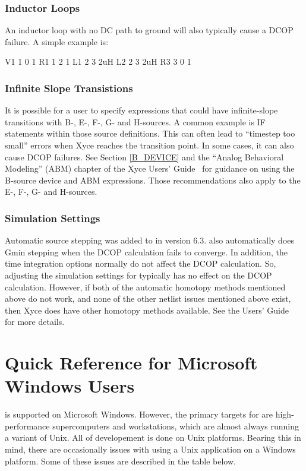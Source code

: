 \subsection{Inductor Loops}
An inductor loop with no DC path to ground will also typically cause a DCOP
failure.  A simple example is:
\begin{vquote}
V1 1 0 1
R1 1 2 1
L1 2 3 2uH
L2 2 3 2uH
R3 3 0 1
\end{vquote}

\subsection{Infinite Slope Transistions}
It is possible for a user to specify expressions that could have infinite-slope 
transitions with B-, E-, F-, G- and H-sources. A common example is IF statements
within those source definitions.  This can often lead to ``timestep too  small''
errors when Xyce reaches the transition point.  In some cases, it can also cause 
DCOP failures.  See Section \ref{B_DEVICE} and the ``Analog Behavioral Modeling'' 
(ABM) chapter of the Xyce Users' Guide~\UsersGuide{} for guidance on using the B-source device 
and ABM expressions.  Those recommendations also apply to the E-, F-, G- 
and H-sources.

\subsection{Simulation Settings}
Automatic source stepping was added to \Xyce{} in version 6.3.  \Xyce{} also automatically 
does Gmin stepping when the DCOP calculation fails to converge.  In addition, the time 
integration options normally do not affect the DCOP calculation.  So, adjusting the simulation
settings for \Xyce{} typically has no effect on the DCOP calculation.  However, if both of
the automatic homotopy methods mentioned above do not work, and none of the other
netlist issues mentioned above exist, then Xyce does have other homotopy methods 
available. See the \Xyce{} Users' Guide~\UsersGuide{} for more details.

\chapter{Quick Reference for Microsoft Windows Users}
\label{Windows_Ref}

\Xyce{} is supported on Microsoft Windows.  However, the primary targets
for \Xyce{} are high-performance supercomputers and workstations, which
are almost always running a variant of Unix.  All of \Xyce{} 
developement is done on Unix platforms.  Bearing this in mind, there are
occasionally issues with using a Unix application on a Windows platform.
Some of these issues are described in the table below.




